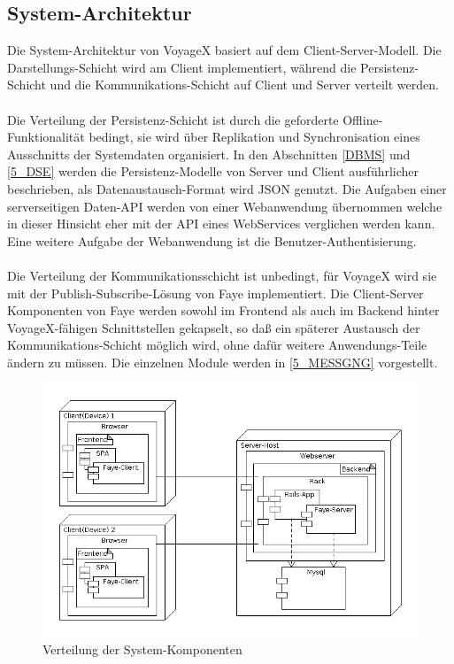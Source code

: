 \subsection{System-Architektur}\label{5_SA}
Die System-Architektur von VoyageX basiert auf dem Client-Server-Modell. Die Darstellungs-Schicht wird am Client implementiert, während die Persistenz-Schicht und die Kommunikations-Schicht auf Client und Server verteilt werden.\\ \\
Die Verteilung der Persistenz-Schicht ist durch die geforderte Offline-Funktionalität bedingt, sie wird über Replikation und Synchronisation eines Ausschnitts der Systemdaten organisiert. In den Abschnitten \ref{DBMS} und \ref{5_DSE} werden die Persistenz-Modelle von Server und Client ausführlicher beschrieben, als Datenaustausch-Format wird JSON genutzt. Die Aufgaben einer serverseitigen Daten-API werden von einer Webanwendung übernommen welche in dieser Hinsicht eher mit der API eines WebServices verglichen werden kann.
Eine weitere Aufgabe der Webanwendung ist die Benutzer-Authentisierung.\\ \\
Die Verteilung der Kommunikationsschicht ist unbedingt, für VoyageX wird sie mit der Publish-Subscribe-Lösung von Faye implementiert. Die Client-Server Komponenten von Faye werden sowohl im Frontend als auch im Backend hinter VoyageX-fähigen Schnittstellen gekapselt, so daß ein späterer Austausch der Kommunikations-Schicht möglich wird, ohne dafür weitere Anwendungs-Teile ändern zu müssen. Die einzelnen Module werden in \ref{5_MESSGNG} vorgestellt.\\
  \begin{figure}[H]
      \centering
	  \includegraphics[scale=0.5]{bilder/system_architecture.png}
  	  \caption{Verteilung der System-Komponenten}
  \end{figure}


